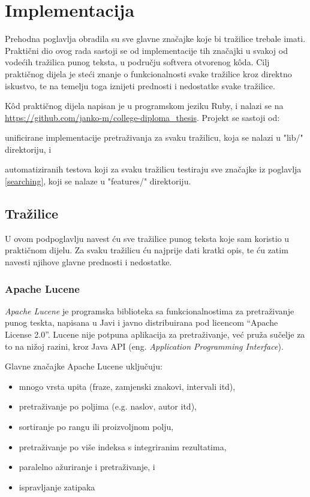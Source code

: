 \documentclass[a4paper,twoside,12pt]{scrreprt}
\begin{document}
\chapter{Implementacija}

Prehodna poglavlja obradila su sve glavne značajke koje bi tražilice trebale imati. Praktični dio ovog rada sastoji se od implementacije tih značajki u svakoj od vodećih tražilica punog teksta, u području softvera otvorenog kôda. Cilj praktičnog dijela je steći znanje o funkcionalnosti svake tražilice kroz direktno iskustvo, te na temelju toga iznijeti prednosti i nedostatke svake tražilice.

Kôd praktičnog dijela napisan je u programskom jeziku Ruby, i nalazi se na \url{https://github.com/janko-m/college-diploma_thesis}. Projekt se sastoji od:

\begin{compactenum}
  \item unificirane implementacije pretraživanja za svaku tražilicu, koja se nalazi u "lib/" direktoriju, i
  \item automatiziranih testova koji za svaku tražilicu testiraju sve značajke iz poglavlja \ref{searching}, koji se nalaze u "features/" direktoriju.
\end{compactenum}

\section{Tražilice}

U ovom podpoglavlju navest ću sve tražilice punog teksta koje sam koristio u praktičnom dijelu. Za svaku tražilicu ću najprije dati kratki opis, te ću zatim navesti njihove glavne prednosti i nedostatke.

\subsection{Apache Lucene}

\textit{Apache Lucene} je programska biblioteka sa funkcionalnostima za pretraživanje punog teskta, napisana u Javi i javno distribuirana pod licencom ``Apache License 2.0''. Lucene nije potpuna aplikacija za pretraživanje, već pruža sučelje za to na nižoj razini, kroz Java API (eng. \textit{Application Programming Interface}).

Glavne značajke Apache Lucene uključuju:

\begin{itemize}
  \item mnogo vrsta upita (fraze, zamjenski znakovi, intervali itd),
  \item pretraživanje po poljima (e.g. naslov, autor itd),
  \item sortiranje po rangu ili proizvoljnom polju,
  \item pretraživanje po više indeksa s integriranim rezultatima,
  \item paralelno ažuriranje i pretraživanje, i
  \item ispravljanje zatipaka
\end{itemize}
\end{document}

